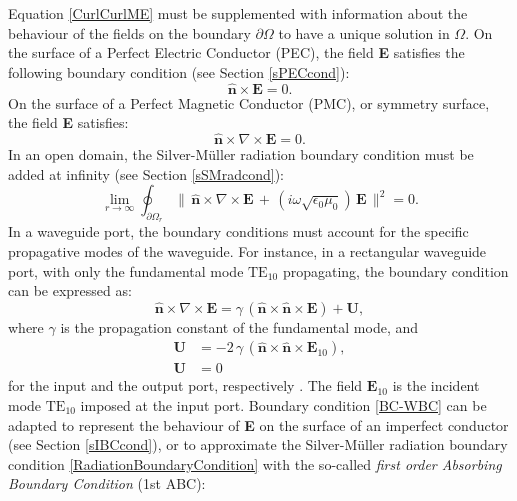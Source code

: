Equation \ref{CurlCurlME} must be supplemented with information about the behaviour of the fields on the boundary $\partial\Omega$ to have a unique solution in $\Omega$. On the surface of a Perfect Electric Conductor (PEC), the field \textbf{E} satisfies the following boundary condition (see Section \ref{sPECcond}):
\begin{equation}\label{BC-PEC}
	\mathbf{\hat{n}}\times\mathbf{E} = 0.
\end{equation}
On the surface of a Perfect Magnetic Conductor (PMC), or symmetry surface, the field \textbf{E} satisfies:
\begin{equation}\label{BC-PMC}
	\mathbf{\hat{n}}\times\nabla\times\mathbf{E} = 0.
\end{equation}
In an open domain, the Silver-M\"{u}ller radiation boundary condition must be added at infinity (see Section \ref{sSMradcond}):
\begin{equation}\label{RadiationBoundaryCondition}
	\lim_{r\rightarrow\infty}\oint_{\partial\Omega_{r}}\|\,\mathbf{\hat{n}}\times\nabla\times\mathbf{E}\, +\,(i\omega\sqrt{\epsilon_{0}\mu_{0}})\,\mathbf{E}\,\|^{2} = 0.
\end{equation}
In a waveguide port, the boundary conditions must account for the specific propagative modes of the waveguide. For instance, in a rectangular waveguide port, with only the fundamental mode $\text{TE}_{10}$ propagating, the boundary condition can be expressed as:
\begin{equation}\label{BC-WBC}
	\mathbf{\hat{n}}\times\nabla\times\mathbf{E} = \gamma\,(\mathbf{\hat{n}}\times\mathbf{\hat{n}}\times\mathbf{E}) + \mathbf{U},
\end{equation}
where $\gamma$ is the propagation constant of the fundamental mode, and
\begin{equation}\label{WGPortConditionsU}
	\begin{aligned}
		\mathbf{U} &= -2\,\gamma\,(\mathbf{\hat{n}}\times\mathbf{\hat{n}}\times\mathbf{E}_{10}),
		\\
		\mathbf{U} &= 0
	\end{aligned}
\end{equation}
for the input and the output port, respectively \cite{Jin}. The field $\mathbf{E}_{10}$ is the incident mode $\text{TE}_{10}$ imposed at the input port. Boundary condition \eqref{BC-WBC} can be adapted to represent the behaviour of \textbf{E} on the surface of an imperfect conductor (see Section \ref{sIBCcond}), or to approximate the Silver-M\"{u}ller radiation boundary condition \eqref{RadiationBoundaryCondition} with the so-called \textit{first order Absorbing Boundary Condition} (1st ABC):
